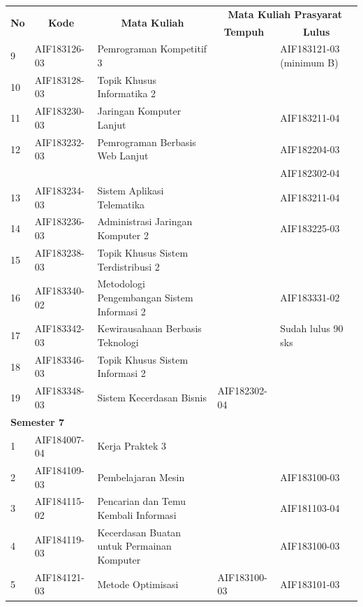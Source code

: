 \begin{table}[H]
	\centering
		\begin{tabular}{|p{0.5cm}|p{2.85cm}|p{4.95cm}|p{2.7cm}|p{2.7cm}|}
			\hline
			\multicolumn{1}{|c|}{\multirow{2}{*}{\textbf{No}}} & \multicolumn{1}{c|}{\multirow{2}{*}{\textbf{Kode}}} & \multicolumn{1}{c|}{\multirow{2}{*}{\textbf{Mata Kuliah}}} & \multicolumn{2}{c|}{\textbf{Mata Kuliah Prasyarat}} \\ \cline{4-5}
			 &  &  & \multicolumn{1}{c|}{\textbf{Tempuh}} & \multicolumn{1}{c|}{\textbf{Lulus}} \\ \hline
			9 & AIF183126-03 & Pemrograman Kompetitif 3 &  & AIF183121-03 (minimum B) \\ \hline
10 & AIF183128-03 & Topik Khusus Informatika 2 &  &  \\ \hline
11 & AIF183230-03 & Jaringan Komputer Lanjut &  & AIF183211-04 \\ \hline
12 & AIF183232-03 & Pemrograman Berbasis Web Lanjut &  & AIF182204-03 \\
 &  &  &  & AIF182302-04 \\ \hline
13 & AIF183234-03 & Sistem Aplikasi Telematika &  & AIF183211-04 \\ \hline
14 & AIF183236-03 & Administrasi Jaringan Komputer 2 &  & AIF183225-03 \\ \hline
15 & AIF183238-03 & Topik Khusus Sistem Terdistribusi 2 &  &  \\ \hline
16 & AIF183340-02 & Metodologi Pengembangan Sistem Informasi 2 &  & AIF183331-02 \\ \hline
17 & AIF183342-03 & Kewirausahaan Berbasis Teknologi &  & Sudah lulus 90 sks \\ \hline
18 & AIF183346-03 & Topik Khusus Sistem Informasi 2 &  &  \\ \hline
19 & AIF183348-03 & Sistem Kecerdasan Bisnis & AIF182302-04 &  \\ \hline
\multicolumn{5}{|l|}{\textbf{Semester 7}} \\ \hline
1 & AIF184007-04 & Kerja Praktek 3 &  &  \\ \hline
2 & AIF184109-03 & Pembelajaran Mesin &  & AIF183100-03 \\ \hline
3 & AIF184115-02 & Pencarian dan Temu Kembali Informasi &  & AIF181103-04 \\ \hline
4 & AIF184119-03 & Kecerdasan Buatan untuk Permainan Komputer &  & AIF183100-03 \\ \hline
5 & AIF184121-03 & Metode Optimisasi & AIF183100-03 & AIF183101-03 \\ \hline

\end{tabular}
\end{table}
